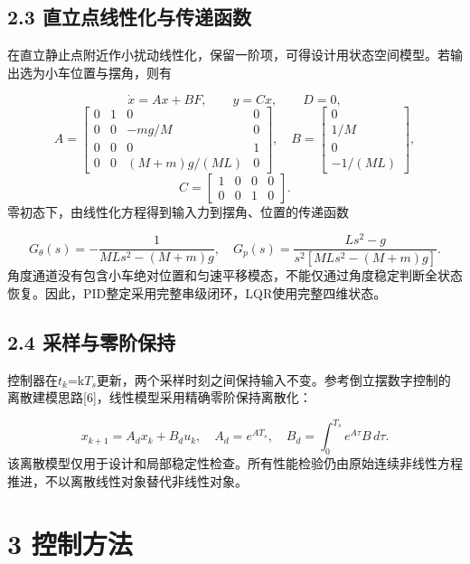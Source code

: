 \documentclass[UTF8,a4paper,fontset=fandol,zihao=5]{ctexart}
\begin{document}
\subsection*{2.3 直立点线性化与传递函数}
在直立静止点附近作小扰动线性化，保留一阶项，可得设计用状态空间模型。若输出选为小车位置与摆角，则有\par
\[
\dot x=Ax+BF,\qquad y=Cx,\qquad D=0,
\]
\[
A=\begin{bmatrix}0&1&0&0\\0&0&-mg/M&0\\0&0&0&1\\0&0&(M+m)g/(ML)&0\end{bmatrix},\quad B=\begin{bmatrix}0\\1/M\\0\\-1/(ML)\end{bmatrix},
\]
\[
C=\begin{bmatrix}1&0&0&0\\0&0&1&0\end{bmatrix}.
\]
零初态下，由线性化方程得到输入力到摆角、位置的传递函数\par
\[
G_{\theta}(s)=-\frac{1}{MLs^2-(M+m)g},\quad G_p(s)=\frac{Ls^2-g}{s^2[MLs^2-(M+m)g]}.
\]
角度通道没有包含小车绝对位置和匀速平移模态，不能仅通过角度稳定判断全状态恢复。因此，PID整定采用完整串级闭环，LQR使用完整四维状态。\par
\subsection*{2.4 采样与零阶保持}
控制器在$t_k$=k$T_s$更新，两个采样时刻之间保持输入不变。参考倒立摆数字控制的离散建模思路[6]，线性模型采用精确零阶保持离散化：\par
\[
x_{k+1}=A_dx_k+B_du_k,\quad A_d=e^{AT_s},\quad B_d=\int_0^{T_s}e^{A\tau}B\,d\tau.
\]
该离散模型仅用于设计和局部稳定性检查。所有性能检验仍由原始连续非线性方程推进，不以离散线性对象替代非线性对象。\par
\section*{3 控制方法}
\end{document}
